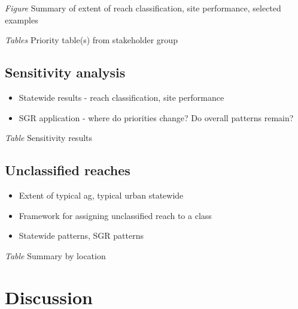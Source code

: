\documentclass[]{article}
\begin{document}
\emph{Figure} Summary of extent of reach classification, site
performance, selected examples

\emph{Tables} Priority table(s) from stakeholder group

\subsection{Sensitivity analysis}\label{sensitivity-analysis}

\begin{itemize}
\item
  Statewide results - reach classification, site performance
\item
  SGR application - where do priorities change? Do overall patterns
  remain?
\end{itemize}

\emph{Table} Sensitivity results

\subsection{Unclassified reaches}\label{unclassified-reaches-1}

\begin{itemize}
\item
  Extent of typical ag, typical urban statewide
\item
  Framework for assigning unclassified reach to a class
\item
  Statewide patterns, SGR patterns
\end{itemize}

\emph{Table} Summary by location

\section{Discussion}\label{discussion}
\end{document}
